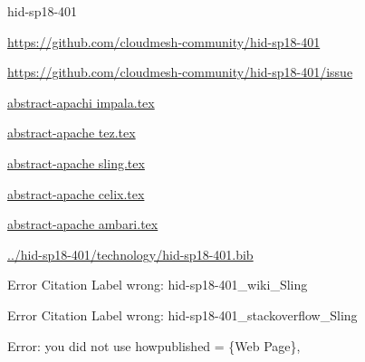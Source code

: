 \begin{IU}

hid-sp18-401

\url{https://github.com/cloudmesh-community/hid-sp18-401}

\url{https://github.com/cloudmesh-community/hid-sp18-401/issue}

\href{https://github.com/cloudmesh-community/hid-sp18-401/blob/master//technology/abstract-apachi impala.tex}{abstract-apachi impala.tex}

\href{https://github.com/cloudmesh-community/hid-sp18-401/blob/master//technology/abstract-apache tez.tex}{abstract-apache tez.tex}

\href{https://github.com/cloudmesh-community/hid-sp18-401/blob/master//technology/abstract-apache sling.tex}{abstract-apache sling.tex}

\href{https://github.com/cloudmesh-community/hid-sp18-401/blob/master//technology/abstract-apache celix.tex}{abstract-apache celix.tex}

\href{https://github.com/cloudmesh-community/hid-sp18-401/blob/master//technology/abstract-apache ambari.tex}{abstract-apache ambari.tex}

\href{https://github.com/cloudmesh-community/hid-sp18-401/blob/master//technology/hid-sp18-401.bib}{../hid-sp18-401/technology/hid-sp18-401.bib}

 Error Citation Label wrong:  hid-sp18-401_wiki_Sling

 Error Citation Label wrong:  hid-sp18-401_stackoverflow_Sling

Error: you did not use howpublished = \{Web Page\},

\end{IU}


